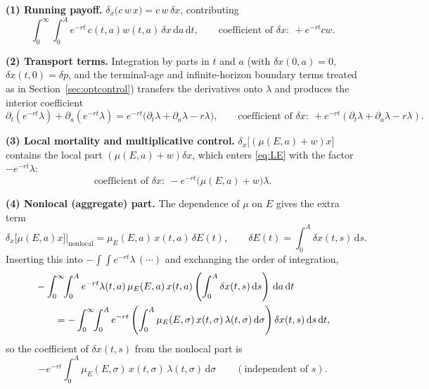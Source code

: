 \documentclass[pdflatex,sn-mathphys-num]{sn-jnl}
\theoremstyle{definition}
\theoremstyle{remark}
\newcommand{\dd}{\,\mathrm{d}}
\begin{document}
\smallskip
\noindent\textbf{(1) Running payoff.}
$\delta_{x}\!\bigl(c\,w\,x\bigr)=c\,w\,\delta x$, contributing
\[
\int_0^\infty\!\!\int_0^A e^{-rt}\,c(t,a)w(t,a)\,\delta x\dd a\dd t,
\qquad\text{coefficient of }\delta x:\ +e^{-rt}cw.
\]

\noindent\textbf{(2) Transport terms.} Integration by parts in $t$ and $a$
(with $\delta x(0,a)=0$, $\delta x(t,0)=\delta p$, and the terminal-age and
infinite-horizon boundary terms treated as in
Section~\ref{sec:optcontrol}) transfers the derivatives onto $\lambda$ and
produces the interior coefficient
\[
\partial_t(e^{-rt}\lambda)+\partial_a(e^{-rt}\lambda)
=e^{-rt}\bigl(\partial_t\lambda+\partial_a\lambda-r\lambda\bigr),
\qquad\text{coefficient of }\delta x:\ +e^{-rt}(\partial_t\lambda+\partial_a\lambda-r\lambda).
\]

\noindent\textbf{(3) Local mortality and multiplicative control.}
$\delta_x\!\bigl[(\mu(E,a)+w)x\bigr]$ contains the local part
$(\mu(E,a)+w)\delta x$, which enters \eqref{eq:LE} with the factor
$-e^{-rt}\lambda$:
\[
\text{coefficient of }\delta x:\ -e^{-rt}\bigl(\mu(E,a)+w\bigr)\lambda.
\]

\noindent\textbf{(4) Nonlocal (aggregate) part.}
The dependence of $\mu$ on $E$ gives the extra term
\[
\delta_x\!\bigl[\mu(E,a)x\bigr]\Big|_{\text{nonlocal}}
=\mu_E(E,a)\,x(t,a)\,\delta E(t),
\qquad
\delta E(t)=\int_0^A\delta x(t,s)\dd s.
\]
Inserting this into $-\int\!\!\int e^{-rt}\lambda\,(\cdots)$ and exchanging the
order of integration,
\begin{align}
&-\int_0^\infty\!\!\int_0^A e^{-rt}\lambda(t,a)\,\mu_E(E,a)\,x(t,a)
\left(\int_0^A\delta x(t,s)\dd s\right)\dd a\dd t
\notag\\
&\qquad=-\int_0^\infty\!\!\int_0^A e^{-rt}
\left(\int_0^A\mu_E(E,\sigma)\,x(t,\sigma)\,\lambda(t,\sigma)\dd\sigma\right)
\delta x(t,s)\dd s\dd t,
\label{eq:nonlocal_variation}
\end{align}
so the coefficient of $\delta x(t,s)$ from the nonlocal part is
\[
-e^{-rt}\int_0^A \mu_E(E,\sigma)\,x(t,\sigma)\,\lambda(t,\sigma)\dd\sigma
\qquad(\text{independent of }s).
\]
\end{document}
